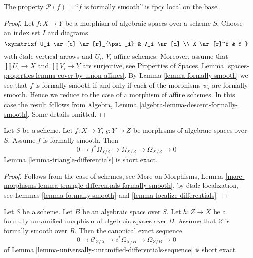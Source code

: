 \begin{lemma}
\label{lemma-descending-property-formally-smooth}
The property $\mathcal{P}(f) =$``$f$ is formally smooth''
is fpqc local on the base.
\end{lemma}

\begin{proof}
Let $f : X \to Y$ be a morphism of algebraic spaces over a scheme $S$.
Choose an index set $I$ and diagrams
$$
\xymatrix{
U_i \ar[d] \ar[r]_{\psi_i} & V_i \ar[d] \\
X \ar[r]^f & Y
}
$$
with \'etale vertical arrows and $U_i$, $V_i$ affine schemes. Moreover,
assume that $\coprod U_i \to X$ and $\coprod V_i \to Y$ are surjective, see
Properties of Spaces,
Lemma \ref{spaces-properties-lemma-cover-by-union-affines}.
By
Lemma \ref{lemma-formally-smooth}
we see that $f$ is formally smooth if and only if each of the morphisms
$\psi_i$ are formally smooth. Hence we reduce to the case of a morphism
of affine schemes. In this case the result follows from
Algebra, Lemma \ref{algebra-lemma-descent-formally-smooth}.
Some details omitted.
\end{proof}

\begin{lemma}
\label{lemma-triangle-differentials-formally-smooth}
Let $S$ be a scheme.
Let $f : X \to Y$, $g : Y \to Z$ be morphisms of algebraic spaces over $S$.
Assume $f$ is formally smooth. Then
$$
0 \to f^*\Omega_{Y/Z} \to \Omega_{X/Z} \to \Omega_{X/Z} \to 0
$$
Lemma \ref{lemma-triangle-differentials}
is short exact.
\end{lemma}

\begin{proof}
Follows from the case of schemes, see
More on Morphisms,
Lemma \ref{more-morphisms-lemma-triangle-differentials-formally-smooth},
by \'etale localization, see
Lemmas \ref{lemma-formally-smooth} and \ref{lemma-localize-differentials}.
\end{proof}

\begin{lemma}
\label{lemma-differentials-formally-unramified-formally-smooth}
Let $S$ be a scheme. Let $B$ be an algebraic space over $S$.
Let $h : Z \to X$ be a formally unramified morphism of algebraic spaces
over $B$.
Assume that $Z$ is formally smooth over $B$. Then the
canonical exact sequence
$$
0 \to \mathcal{C}_{Z/X} \to i^*\Omega_{X/B} \to \Omega_{Z/B} \to 0
$$
of
Lemma \ref{lemma-universally-unramified-differentials-sequence}
is short exact.
\end{lemma}

